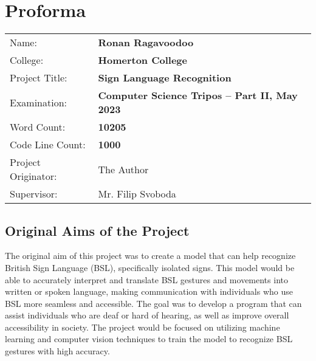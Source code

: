 \documentclass[final,rdr32.tex]{subfiles}
\begin{document}
\pagestyle{plain}

\chapter*{Proforma}

 {\large
  \begin{tabular}{ll}
      Name:               & \bf Ronan Ragavoodoo                             \\
      College:            & \bf Homerton College                             \\
      Project Title:      & \bf Sign Language Recognition                    \\
      Examination:        & \bf Computer Science Tripos -- Part II, May 2023 \\
      Word Count:         & \bf 10205\footnotemark[1]                        \\
      Code Line Count:    & \bf 1000\footnotemark[2]                         \\
      Project Originator: & The Author                                       \\
      Supervisor:         & Mr. Filip Svoboda                                \\
  \end{tabular}
 }


\section*{Original Aims of the Project}


The original aim of this project was to create a model that can help recognize British Sign Language (BSL), specifically isolated signs. This model would be able to accurately interpret and translate BSL gestures and movements into written or spoken language, making communication with individuals who use BSL more seamless and accessible. The goal was to develop a program that can assist individuals who are deaf or hard of hearing, as well as improve overall accessibility in society. The project would be focused on utilizing machine learning and computer vision techniques to train the model to recognize BSL gestures with high accuracy.
\end{document}
